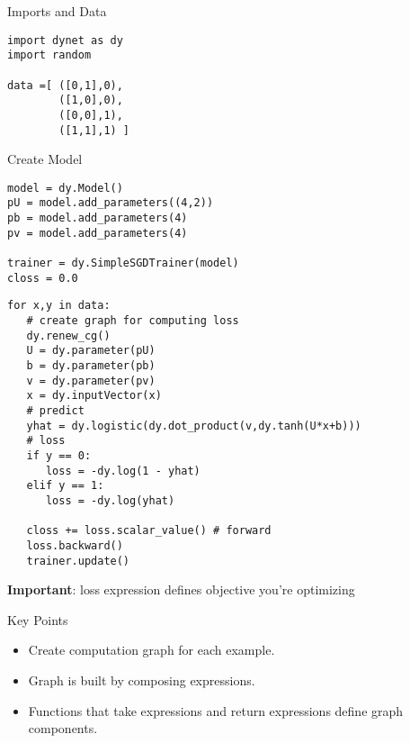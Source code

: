 \documentclass[compress]{beamer}
\begin{document}
\begin{frame}[fragile]{Imports and Data}

\begin{verbatim}
import dynet as dy
import random

data =[ ([0,1],0),
        ([1,0],0),
        ([0,0],1),
        ([1,1],1) ]
\end{verbatim}

\end{frame}


\begin{frame}[fragile]{Create Model}

\begin{verbatim}
model = dy.Model()
pU = model.add_parameters((4,2))
pb = model.add_parameters(4)
pv = model.add_parameters(4)

trainer = dy.SimpleSGDTrainer(model)
closs = 0.0
\end{verbatim}

\end{frame}


\begin{frame}[fragile]{}

\begin{verbatim}
for x,y in data:
   # create graph for computing loss
   dy.renew_cg()
   U = dy.parameter(pU)
   b = dy.parameter(pb)
   v = dy.parameter(pv)
   x = dy.inputVector(x)
   # predict
   yhat = dy.logistic(dy.dot_product(v,dy.tanh(U*x+b)))
   # loss
   if y == 0:
      loss = -dy.log(1 - yhat)
   elif y == 1:
      loss = -dy.log(yhat)

   closs += loss.scalar_value() # forward
   loss.backward()
   trainer.update()
\end{verbatim}
\pause
{\bf Important}: loss expression defines objective you're optimizing

\end{frame}

\begin{frame}{Key Points}

\begin{itemize}
  \item Create computation graph for each example.
  \item Graph is built by composing expressions.
  \item Functions that take expressions and return expressions define graph components.
\end{itemize}

\end{frame}
\end{document}
